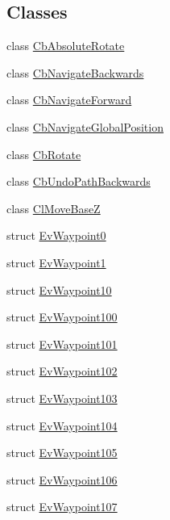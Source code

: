 \subsection*{Classes}
\begin{DoxyCompactItemize}
\item 
class \hyperlink{classmove__base__z__client_1_1CbAbsoluteRotate}{Cb\+Absolute\+Rotate}
\item 
class \hyperlink{classmove__base__z__client_1_1CbNavigateBackwards}{Cb\+Navigate\+Backwards}
\item 
class \hyperlink{classmove__base__z__client_1_1CbNavigateForward}{Cb\+Navigate\+Forward}
\item 
class \hyperlink{classmove__base__z__client_1_1CbNavigateGlobalPosition}{Cb\+Navigate\+Global\+Position}
\item 
class \hyperlink{classmove__base__z__client_1_1CbRotate}{Cb\+Rotate}
\item 
class \hyperlink{classmove__base__z__client_1_1CbUndoPathBackwards}{Cb\+Undo\+Path\+Backwards}
\item 
class \hyperlink{classmove__base__z__client_1_1ClMoveBaseZ}{Cl\+Move\+BaseZ}
\item 
struct \hyperlink{structmove__base__z__client_1_1EvWaypoint0}{Ev\+Waypoint0}
\item 
struct \hyperlink{structmove__base__z__client_1_1EvWaypoint1}{Ev\+Waypoint1}
\item 
struct \hyperlink{structmove__base__z__client_1_1EvWaypoint10}{Ev\+Waypoint10}
\item 
struct \hyperlink{structmove__base__z__client_1_1EvWaypoint100}{Ev\+Waypoint100}
\item 
struct \hyperlink{structmove__base__z__client_1_1EvWaypoint101}{Ev\+Waypoint101}
\item 
struct \hyperlink{structmove__base__z__client_1_1EvWaypoint102}{Ev\+Waypoint102}
\item 
struct \hyperlink{structmove__base__z__client_1_1EvWaypoint103}{Ev\+Waypoint103}
\item 
struct \hyperlink{structmove__base__z__client_1_1EvWaypoint104}{Ev\+Waypoint104}
\item 
struct \hyperlink{structmove__base__z__client_1_1EvWaypoint105}{Ev\+Waypoint105}
\item 
struct \hyperlink{structmove__base__z__client_1_1EvWaypoint106}{Ev\+Waypoint106}
\item 
struct \hyperlink{structmove__base__z__client_1_1EvWaypoint107}{Ev\+Waypoint107}
\item 

\end{DoxyCompactItemize}
